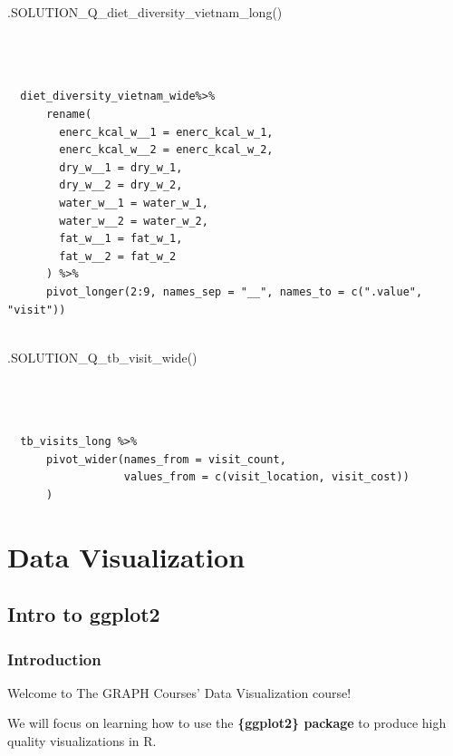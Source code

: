 \documentclass[
  letterpaper,
  DIV=11,
  numbers=noendperiod]{scrreprt}
\newenvironment{Shaded}{\begin{snugshade}}{\end{snugshade}}
\newcommand{\FunctionTok}[1]{\textcolor[rgb]{0.28,0.35,0.67}{#1}}
\newcommand{\NormalTok}[1]{\textcolor[rgb]{0.00,0.23,0.31}{#1}}
\begin{document}
\begin{Shaded}
\begin{Highlighting}[]
\FunctionTok{.SOLUTION\_Q\_diet\_diversity\_vietnam\_long}\NormalTok{()}
\end{Highlighting}
\end{Shaded}

\begin{verbatim}


  
  diet_diversity_vietnam_wide%>%
      rename(
        enerc_kcal_w__1 = enerc_kcal_w_1,
        enerc_kcal_w__2 = enerc_kcal_w_2,
        dry_w__1 = dry_w_1,
        dry_w__2 = dry_w_2,
        water_w__1 = water_w_1,
        water_w__2 = water_w_2,
        fat_w__1 = fat_w_1,
        fat_w__2 = fat_w_2
      ) %>%  
      pivot_longer(2:9, names_sep = "__", names_to = c(".value", "visit"))
  
\end{verbatim}

\begin{Shaded}
\begin{Highlighting}[]
\FunctionTok{.SOLUTION\_Q\_tb\_visit\_wide}\NormalTok{()}
\end{Highlighting}
\end{Shaded}

\begin{verbatim}


  
  tb_visits_long %>%
      pivot_wider(names_from = visit_count,
                  values_from = c(visit_location, visit_cost))
      )
\end{verbatim}

\part{Data Visualization}

\chapter{Intro to ggplot2}\label{intro-to-ggplot2}

\section{Introduction}\label{introduction-12}

Welcome to The GRAPH Courses' Data Visualization course!

We will focus on learning how to use the \textbf{\{ggplot2\} package} to
produce high quality visualizations in R.
\end{document}
